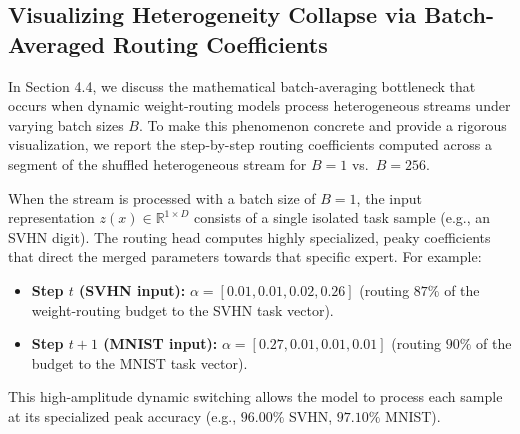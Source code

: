 \documentclass{article}
\theoremstyle{plain}
\theoremstyle{definition}
\theoremstyle{remark}
\begin{document}
\subsection{Visualizing Heterogeneity Collapse via Batch-Averaged Routing Coefficients}
\label{sec:appendix_heterogeneity_collapse}

In Section 4.4, we discuss the mathematical batch-averaging bottleneck that occurs when dynamic weight-routing models process heterogeneous streams under varying batch sizes $B$. To make this phenomenon concrete and provide a rigorous visualization, we report the step-by-step routing coefficients computed across a segment of the shuffled heterogeneous stream for $B=1$ vs.\ $B=256$.

When the stream is processed with a batch size of $B=1$, the input representation $z(x) \in \mathbb{R}^{1 \times D}$ consists of a single isolated task sample (e.g., an SVHN digit). The routing head computes highly specialized, peaky coefficients that direct the merged parameters towards that specific expert. For example:
\begin{itemize}
    \item \textbf{Step $t$ (SVHN input):} $\alpha = [0.01, 0.01, 0.02, 0.26]$ (routing $87\%$ of the weight-routing budget to the SVHN task vector).
    \item \textbf{Step $t+1$ (MNIST input):} $\alpha = [0.27, 0.01, 0.01, 0.01]$ (routing $90\%$ of the budget to the MNIST task vector).
\end{itemize}
This high-amplitude dynamic switching allows the model to process each sample at its specialized peak accuracy (e.g., $96.00\%$ SVHN, $97.10\%$ MNIST).
\end{document}
